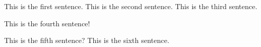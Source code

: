 This is the first sentence.
This is the second sentence.
This is the third sentence.



This is the fourth sentence!


This is the fifth sentence?
This is the sixth sentence.
